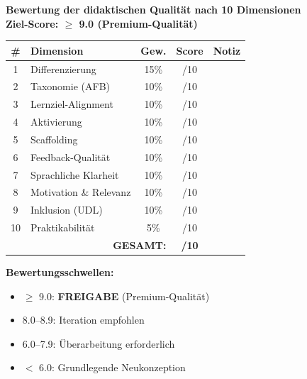 \documentclass[11pt,a4paper]{article}
\begin{document}
\begin{scorebox}
\textbf{Bewertung der didaktischen Qualität nach 10 Dimensionen}\\
\textbf{Ziel-Score: $\geq$ 9.0 (Premium-Qualität)}

\vspace{1em}
\begin{tabular}{|c|l|c|c|p{4.5cm}|}
\hline
\textbf{\#} & \textbf{Dimension} & \textbf{Gew.} & \textbf{Score} & \textbf{Notiz} \\
\hline
1 & Differenzierung & 15\% & /10 & \\
\hline
2 & Taxonomie (AFB) & 10\% & /10 & \\
\hline
3 & Lernziel-Alignment & 10\% & /10 & \\
\hline
4 & Aktivierung & 10\% & /10 & \\
\hline
5 & Scaffolding & 10\% & /10 & \\
\hline
6 & Feedback-Qualität & 10\% & /10 & \\
\hline
7 & Sprachliche Klarheit & 10\% & /10 & \\
\hline
8 & Motivation \& Relevanz & 10\% & /10 & \\
\hline
9 & Inklusion (UDL) & 10\% & /10 & \\
\hline
10 & Praktikabilität & 5\% & /10 & \\
\hline
\multicolumn{3}{|r|}{\textbf{GESAMT:}} & \textbf{/10} & \\
\hline
\end{tabular}

\vspace{1em}
\textbf{Bewertungsschwellen:}
\begin{itemize}
    \item[$\Box$] \textcolor{successgreen}{$\geq$ 9.0: \textbf{FREIGABE} (Premium-Qualität)}
    \item[$\Box$] \textcolor{warningorange}{8.0--8.9: Iteration empfohlen}
    \item[$\Box$] 6.0--7.9: Überarbeitung erforderlich
    \item[$\Box$] $<$ 6.0: Grundlegende Neukonzeption
\end{itemize}
\end{scorebox}
\end{document}
